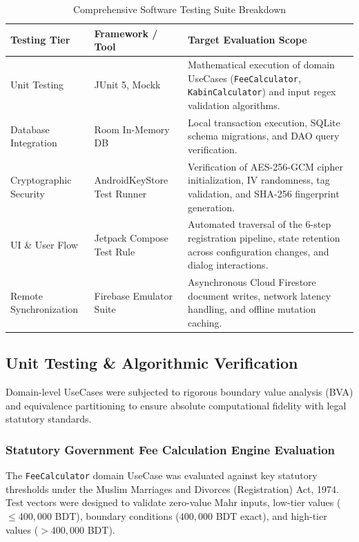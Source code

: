 \documentclass[12pt,a4paper]{article}
\begin{document}
	\begin{table}[h!]
		\centering
		\small
		\caption{Comprehensive Software Testing Suite Breakdown}
		\label{tab:testing_suite}
		\begin{tabularx}{\textwidth}{@{}l l L@{}}
			\toprule
			\textbf{Testing Tier} & \textbf{Framework / Tool} & \textbf{Target Evaluation Scope} \\ \midrule
			Unit Testing & JUnit 5, Mockk & Mathematical execution of domain UseCases (\texttt{FeeCalculator}, \texttt{KabinCalculator}) and input regex validation algorithms. \\ \addlinespace
			Database Integration & Room In-Memory DB & Local transaction execution, SQLite schema migrations, and DAO query verification. \\ \addlinespace
			Cryptographic Security & AndroidKeyStore Test Runner & Verification of AES-256-GCM cipher initialization, IV randomness, tag validation, and SHA-256 fingerprint generation. \\ \addlinespace
			UI \& User Flow & Jetpack Compose Test Rule & Automated traversal of the 6-step registration pipeline, state retention across configuration changes, and dialog interactions. \\ \addlinespace
			Remote Synchronization & Firebase Emulator Suite & Asynchronous Cloud Firestore document writes, network latency handling, and offline mutation caching. \\ \bottomrule
		\end{tabularx}
	\end{table}
	
	\subsection{Unit Testing \& Algorithmic Verification}
	Domain-level UseCases were subjected to rigorous boundary value analysis (BVA) and equivalence partitioning to ensure absolute computational fidelity with legal statutory standards.
	
	\subsubsection{Statutory Government Fee Calculation Engine Evaluation}
	The \texttt{FeeCalculator} domain UseCase was evaluated against key statutory thresholds under the Muslim Marriages and Divorces (Registration) Act, 1974. Test vectors were designed to validate zero-value Mahr inputs, low-tier values ($\le 400{,}000$ BDT), boundary conditions ($400{,}000$ BDT exact), and high-tier values ($> 400{,}000$ BDT).
	
\end{document}
